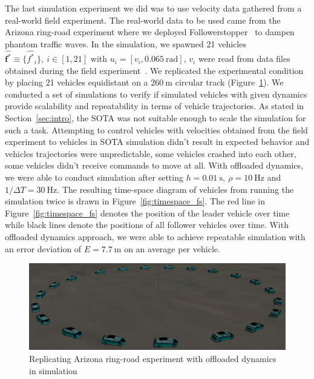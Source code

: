 \documentclass[aps,pra,twocolumn,notitlepage,nofootinbib,superscriptaddress]{revtex4-1}
\def\fbf{{\mathbf f}}
\begin{document}
The last simulation experiment we did was to use velocity data gathered from a real-world field experiment. The real-world data to be used came from the Arizona ring-road experiment where we deployed Followerstopper~\cite{bhadani2018dissipation} to dampen phantom traffic waves. In the simulation, we spawned 21 vehicles $\hat{\fbf^*} \equiv \{\hat{f^*}_i\},~i \in [1, 21]$ with $u_i = [v_i,  0.065~\textrm{rad}]$, $v_i$ were read from data files obtained during the field experiment~\cite{464}.
We replicated the experimental condition by placing 21 vehicles equidistant on a $260~\textrm{m}$ circular track (Figure~\ref{fig:21vehicles}). We conducted a set of simulations to verify if simulated vehicles with given dynamics provide scalability and repeatability in terms of vehicle trajectories. As stated in Section~\ref{sec:intro}, the SOTA was not suitable enough to scale the simulation for such a task.  Attempting to control vehicles with velocities obtained from the field experiment to vehicles in SOTA simulation didn't result in expected behavior and vehicles trajectories were unpredictable, some vehicles crashed into each other, some vehicles didn't receive commands to move at all. With offloaded dynamics, we were able to conduct simulation after setting $h = 0.01~\textrm{s},~\rho = 10~\textrm{Hz}$  and $1/\Delta T = 30~\textrm{Hz}$. The resulting time-space diagram of vehicles from running the simulation twice is drawn in Figure~\ref{fig:timespace_fs}. The red line in Figure~\ref{fig:timespace_fs} denotes the position of the leader vehicle over time while black lines denote the positions of all follower vehicles over time. With offloaded dynamics approach, we were able to achieve repeatable simulation with an error deviation of $E = 7.7~\textrm{m}$ on an average per vehicle.


\begin{figure}[h]
    \centering

    \includegraphics[clip,width=0.99\linewidth]{21vehicles.png}
    \caption{Replicating Arizona ring-road experiment with offloaded dynamics in simulation}
    \label{fig:21vehicles}

\end{figure}
\end{document}
